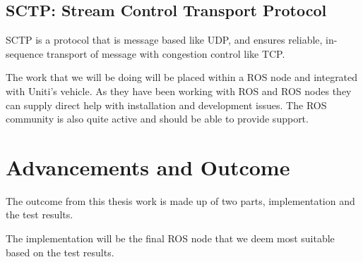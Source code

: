 \documentclass[a4paper]{article}
\begin{document}
\subsection{SCTP: Stream Control Transport Protocol}
SCTP is a protocol that is message based like UDP, and ensures reliable,
in-sequence transport of message with congestion control like TCP.
\cite{spec_SCTP}

The work that we will be doing will be placed within a ROS node and integrated
with Uniti's vehicle. As they have been working with ROS and ROS nodes they can
supply direct help with installation and development issues. The ROS community
is also quite active and should be able to provide support.






\section{Advancements and Outcome}




The outcome from this thesis work is made up of two parts, implementation and
the test results.

The implementation will be the final ROS node that we deem most suitable based
on the test results.
\end{document}
